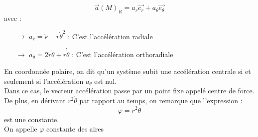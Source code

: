 $$\vec{a}(M)_R = a_r\vec{e_r} + a_{\theta}\vec{e_{\theta}}$$
avec : 
\begin{itemize}
 \item[$\rightarrow$] $a_r = \dot{r}\dot{} - r\dot{\theta}^2$ : C'est l'accélération radiale
 \item[$\rightarrow$] $a_{\theta} = 2\dot{r}\dot{\theta} + r\dot{\dot{\theta}}$ : C'est l'accélération orthoradiale
\end{itemize}
En coordonnée polaire, on dit qu'un système subit une accélération centrale si et seulement si l'accélération $a_{\theta}$ est nul. \\
Dans ce cas, le vecteur accélération passe par un point fixe appelé centre de force.\\
De plus, en dérivant $r^2\dot{\theta}$ par rapport au temps, on remarque que l'expression :
$$\varphi = r^2\dot{\theta} $$
est une constante.\\
On appelle $\varphi$ constante des aires
